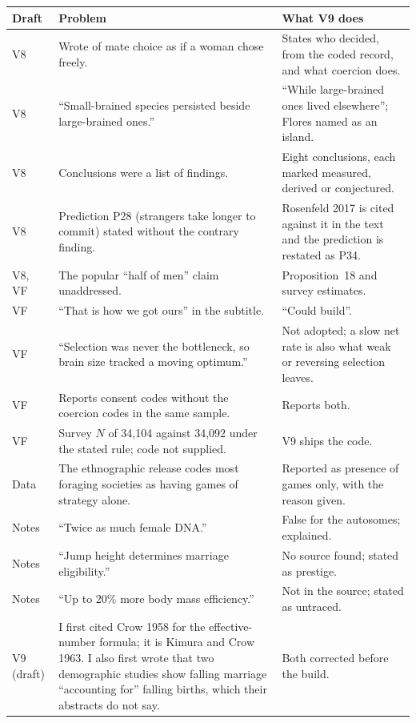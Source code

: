 \documentclass[10pt,letterpaper]{extarticle}
\begin{document}
{\small
\begin{longtable}{@{}P{0.07\textwidth}P{0.45\textwidth}P{0.42\textwidth}@{}}
\toprule
Draft & Problem & What V9 does\\
\midrule
\endhead
V8 & Wrote of mate choice as if a woman chose freely. & States who decided, from the coded record, and what coercion does.\\
V8 & ``Small-brained species persisted beside large-brained ones.'' & ``While large-brained ones lived elsewhere''; Flores named as an island.\\
V8 & Conclusions were a list of findings. & Eight conclusions, each marked measured, derived or conjectured.\\
V8 & Prediction P28 (strangers take longer to commit) stated without the contrary finding. & Rosenfeld 2017 is cited against it in the text and the prediction is restated as P34.\\
V8, VF & The popular ``half of men'' claim unaddressed. & Proposition~18 and survey estimates.\\
VF & ``That is how we got ours'' in the subtitle. & ``Could build''.\\
VF & ``Selection was never the bottleneck, so brain size tracked a moving optimum.'' & Not adopted; a slow net rate is also what weak or reversing selection leaves.\\
VF & Reports consent codes without the coercion codes in the same sample. & Reports both.\\
VF & Survey $N$ of 34{,}104 against 34{,}092 under the stated rule; code not supplied. & V9 ships the code.\\
Data & The ethnographic release codes most foraging societies as having games of strategy alone. & Reported as presence of games only, with the reason given.\\
Notes & ``Twice as much female DNA.'' & False for the autosomes; explained.\\
Notes & ``Jump height determines marriage eligibility.'' & No source found; stated as prestige.\\
Notes & ``Up to 20\% more body mass efficiency.'' & Not in the source; stated as untraced.\\
V9 (draft) & I first cited Crow 1958 for the effective-number formula; it is Kimura and Crow 1963. I also first wrote that two demographic studies show falling marriage ``accounting for'' falling births, which their abstracts do not say. & Both corrected before the build.\\
\bottomrule
\end{longtable}}
\end{document}
